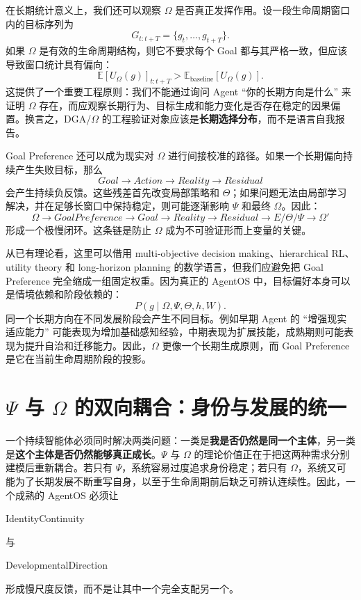 在长期统计意义上，我们还可以观察 $\Omega$ 是否真正发挥作用。设一段生命周期窗口内的目标序列为
\[
G_{t:t+T}
=
\{g_t,\ldots,g_{t+T}\}.
\]
如果 $\Omega$ 是有效的生命周期结构，则它不要求每个 Goal 都与其严格一致，但应该导致窗口统计具有偏向：
\[
\mathbb E
\left[
U_{\Omega}(g)
\right]_{t:t+T}
>
\mathbb E_{\text{baseline}}
\left[
U_{\Omega}(g)
\right].
\]
这提供了一个重要工程原则：我们不能通过询问 Agent ``你的长期方向是什么'' 来证明 $\Omega$ 存在，而应观察长期行为、目标生成和能力变化是否存在稳定的因果偏置。换言之，DGA/$\Omega$ 的工程验证对象应该是\textbf{长期选择分布}，而不是语言自我报告。

Goal Preference 还可以成为现实对 $\Omega$ 进行间接校准的路径。如果一个长期偏向持续产生失败目标，那么
\[
Goal
\rightarrow
Action
\rightarrow
Reality
\rightarrow
Residual
\]
会产生持续负反馈。这些残差首先改变局部策略和 $\Theta$；如果问题无法由局部学习解决，并在足够长窗口中保持稳定，则可能逐渐影响 $\Psi$ 和最终 $\Omega$。因此：
\[
\Omega
\rightarrow
GoalPreference
\rightarrow
Goal
\rightarrow
Reality
\rightarrow
Residual
\rightarrow
E/\Theta/\Psi
\rightarrow
\Omega'
\]
形成一个极慢闭环。这条链是防止 $\Omega$ 成为不可验证形而上变量的关键。

从已有理论看，这里可以借用 multi-objective decision making、hierarchical RL、utility theory 和 long-horizon planning 的数学语言，但我们应避免把 Goal Preference 完全缩成一组固定权重。因为真正的 AgentOS 中，目标偏好本身可以是情境依赖和阶段依赖的：
\[
P(g\mid
\Omega,\Psi,\Theta,h,W).
\]
同一个长期方向在不同发展阶段会产生不同目标。例如早期 Agent 的 ``增强现实适应能力'' 可能表现为增加基础感知经验，中期表现为扩展技能，成熟期则可能表现为提升自治和迁移能力。因此，$\Omega$ 更像一个长期生成原则，而 Goal Preference 是它在当前生命周期阶段的投影。

\section{$\Psi$ 与 $\Omega$ 的双向耦合：身份与发展的统一}

一个持续智能体必须同时解决两类问题：一类是\textbf{我是否仍然是同一个主体}，另一类是\textbf{这个主体是否仍然能够真正成长}。$\Psi$ 与 $\Omega$ 的理论价值正在于把这两种需求分别建模后重新耦合。若只有 $\Psi$，系统容易过度追求身份稳定；若只有 $\Omega$，系统又可能为了长期发展不断重写自身，以至于生命周期前后缺乏可辨认连续性。因此，一个成熟的 AgentOS 必须让
\begin{statementbox}
IdentityContinuity
\end{statementbox}
与
\begin{statementbox}
DevelopmentalDirection
\end{statementbox}
形成慢尺度反馈，而不是让其中一个完全支配另一个。

